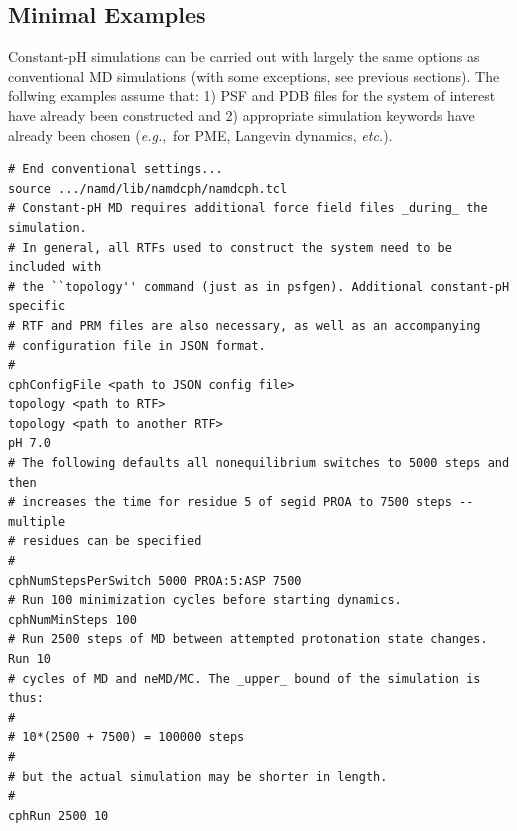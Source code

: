 
\subsection{Minimal Examples}

Constant-pH simulations can be carried out with largely the same options as
  conventional MD simulations (with some exceptions, see previous sections).
The follwing examples assume that: 1) PSF and PDB files for the
  system of interest have already been constructed and 2) appropriate
  simulation keywords have already been chosen (\textit{e.g.},~for PME,
  Langevin dynamics, \textit{etc.}).
\begin{verbatim}
# End conventional settings...
source .../namd/lib/namdcph/namdcph.tcl
# Constant-pH MD requires additional force field files _during_ the simulation.
# In general, all RTFs used to construct the system need to be included with
# the ``topology'' command (just as in psfgen). Additional constant-pH specific
# RTF and PRM files are also necessary, as well as an accompanying
# configuration file in JSON format.
#
cphConfigFile <path to JSON config file>
topology <path to RTF>
topology <path to another RTF>
pH 7.0
# The following defaults all nonequilibrium switches to 5000 steps and then
# increases the time for residue 5 of segid PROA to 7500 steps -- multiple
# residues can be specified 
#
cphNumStepsPerSwitch 5000 PROA:5:ASP 7500
# Run 100 minimization cycles before starting dynamics.
cphNumMinSteps 100
# Run 2500 steps of MD between attempted protonation state changes. Run 10
# cycles of MD and neMD/MC. The _upper_ bound of the simulation is thus:
#
# 10*(2500 + 7500) = 100000 steps
#
# but the actual simulation may be shorter in length.
#
cphRun 2500 10
\end{verbatim}

